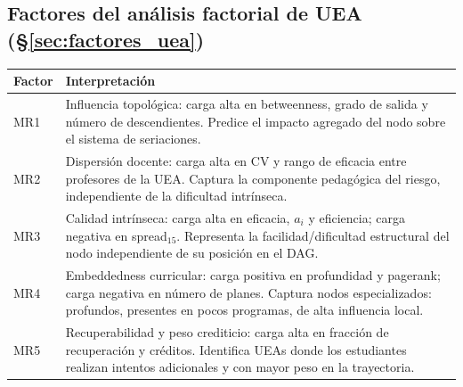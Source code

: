\documentclass[11pt,letterpaper]{article}
\begin{document}
\bigskip
\subsection{Factores del análisis factorial de UEA (\S\ref{sec:factores_uea})}

\begin{tabularx}{\linewidth}{@{}lX@{}}
\toprule
Factor & Interpretación \\
\midrule
MR1 & Influencia topológica: carga alta en betweenness, grado de salida y
      número de descendientes.  Predice el impacto agregado del nodo
      sobre el sistema de seriaciones. \\[4pt]
MR2 & Dispersión docente: carga alta en CV y rango de eficacia entre
      profesores de la UEA.  Captura la componente pedagógica del riesgo,
      independiente de la dificultad intrínseca. \\[4pt]
MR3 & Calidad intrínseca: carga alta en eficacia, $a_i$ y eficiencia;
      carga negativa en spread$_{15}$.  Representa la facilidad/dificultad
      estructural del nodo independiente de su posición en el DAG. \\[4pt]
MR4 & Embeddedness curricular: carga positiva en profundidad y pagerank;
      carga negativa en número de planes.  Captura nodos especializados:
      profundos, presentes en pocos programas, de alta influencia local. \\[4pt]
MR5 & Recuperabilidad y peso crediticio: carga alta en fracción de
      recuperación y créditos.  Identifica UEAs donde los estudiantes
      realizan intentos adicionales y con mayor peso en la trayectoria. \\
\bottomrule
\end{tabularx}
\end{document}
